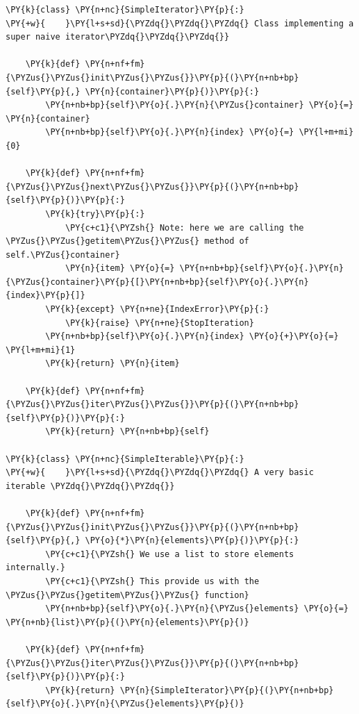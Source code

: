\begin{Verbatim}[label=\makebox{\url{https://github.com/lucabaldini/cmepda/tree/master/slides/latex/snippets/simple\_iterator.py}},commandchars=\\\{\}]
\PY{k}{class} \PY{n+nc}{SimpleIterator}\PY{p}{:}
\PY{+w}{    }\PY{l+s+sd}{\PYZdq{}\PYZdq{}\PYZdq{} Class implementing a super naive iterator\PYZdq{}\PYZdq{}\PYZdq{}}
    
    \PY{k}{def} \PY{n+nf+fm}{\PYZus{}\PYZus{}init\PYZus{}\PYZus{}}\PY{p}{(}\PY{n+nb+bp}{self}\PY{p}{,} \PY{n}{container}\PY{p}{)}\PY{p}{:}
        \PY{n+nb+bp}{self}\PY{o}{.}\PY{n}{\PYZus{}container} \PY{o}{=} \PY{n}{container}
        \PY{n+nb+bp}{self}\PY{o}{.}\PY{n}{index} \PY{o}{=} \PY{l+m+mi}{0}
    
    \PY{k}{def} \PY{n+nf+fm}{\PYZus{}\PYZus{}next\PYZus{}\PYZus{}}\PY{p}{(}\PY{n+nb+bp}{self}\PY{p}{)}\PY{p}{:}
        \PY{k}{try}\PY{p}{:}
            \PY{c+c1}{\PYZsh{} Note: here we are calling the \PYZus{}\PYZus{}getitem\PYZus{}\PYZus{} method of self.\PYZus{}container}
            \PY{n}{item} \PY{o}{=} \PY{n+nb+bp}{self}\PY{o}{.}\PY{n}{\PYZus{}container}\PY{p}{[}\PY{n+nb+bp}{self}\PY{o}{.}\PY{n}{index}\PY{p}{]}
        \PY{k}{except} \PY{n+ne}{IndexError}\PY{p}{:}
            \PY{k}{raise} \PY{n+ne}{StopIteration}
        \PY{n+nb+bp}{self}\PY{o}{.}\PY{n}{index} \PY{o}{+}\PY{o}{=} \PY{l+m+mi}{1}
        \PY{k}{return} \PY{n}{item}
    
    \PY{k}{def} \PY{n+nf+fm}{\PYZus{}\PYZus{}iter\PYZus{}\PYZus{}}\PY{p}{(}\PY{n+nb+bp}{self}\PY{p}{)}\PY{p}{:}
        \PY{k}{return} \PY{n+nb+bp}{self}
        
\PY{k}{class} \PY{n+nc}{SimpleIterable}\PY{p}{:}
\PY{+w}{    }\PY{l+s+sd}{\PYZdq{}\PYZdq{}\PYZdq{} A very basic iterable \PYZdq{}\PYZdq{}\PYZdq{}}
    
    \PY{k}{def} \PY{n+nf+fm}{\PYZus{}\PYZus{}init\PYZus{}\PYZus{}}\PY{p}{(}\PY{n+nb+bp}{self}\PY{p}{,} \PY{o}{*}\PY{n}{elements}\PY{p}{)}\PY{p}{:}
        \PY{c+c1}{\PYZsh{} We use a list to store elements internally.}
        \PY{c+c1}{\PYZsh{} This provide us with the \PYZus{}\PYZus{}getitem\PYZus{}\PYZus{} function}
        \PY{n+nb+bp}{self}\PY{o}{.}\PY{n}{\PYZus{}elements} \PY{o}{=} \PY{n+nb}{list}\PY{p}{(}\PY{n}{elements}\PY{p}{)}
    
    \PY{k}{def} \PY{n+nf+fm}{\PYZus{}\PYZus{}iter\PYZus{}\PYZus{}}\PY{p}{(}\PY{n+nb+bp}{self}\PY{p}{)}\PY{p}{:}
        \PY{k}{return} \PY{n}{SimpleIterator}\PY{p}{(}\PY{n+nb+bp}{self}\PY{o}{.}\PY{n}{\PYZus{}elements}\PY{p}{)}
\end{Verbatim}